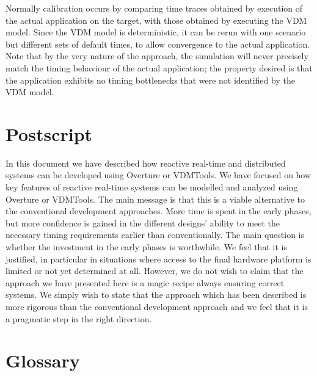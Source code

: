 \documentclass{overturerepchap}
\newcommand{\VDMTools}{VDMTools}
\begin{document}
Normally calibration occurs by comparing time traces obtained by
execution of the actual application on the target, with those obtained
by executing the VDM model.  Since the VDM model is deterministic,
it can be rerun with one scenario but different sets of default times,
to allow convergence to the actual application. Note that by the very
nature of the approach, the simulation will never precisely match the
timing behaviour of the actual application; the property desired is
that the application exhibits no timing bottlenecks that were not
identified by the VDM model.

\chapter{Postscript}\label{chap:postscript}

In this document we have described how reactive real-time and distributed systems can
be developed using Overture or
\VDMTools. We have focused on how key features of
reactive real-time systems can be modelled and analyzed using
Overture or 
\VDMTools. The main message is that this is a viable alternative to
the conventional development approaches. More time is spent in the
early phases, but more confidence is gained in the different designs'
ability to meet the necessary timing requirements earlier than
conventionally. The main question is whether the investment in the
early phases is worthwhile. We feel that it is justified, in
particular in situations where access to the final hardware platform
is limited or not yet determined at all. However, we do not wish to
claim that the approach we have presented here is a magic recipe
always ensuring correct systems. We simply wish to state that the
approach which has been described is more rigorous than the
conventional development approach and we feel that it is a pragmatic
step in the right direction.

\newpage






\newpage
\appendix


\chapter{Glossary}\label{app:glossary}
\end{document}
